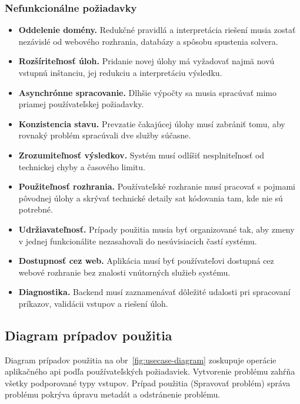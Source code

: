 \subsubsection{Nefunkcionálne požiadavky}\label{sec:design:nonfunctional-requirements}
\begin{itemize}
    \item \textbf{Oddelenie domény.} Redukčné pravidlá a interpretácia riešení musia zostať nezávislé od webového rozhrania, databázy a spôsobu spustenia solvera.
    \item \textbf{Rozšíriteľnosť úloh.} Pridanie novej úlohy má vyžadovať najmä novú vstupnú inštanciu, jej redukciu a interpretáciu výsledku.
    \item \textbf{Asynchrónne spracovanie.} Dlhšie výpočty sa musia spracúvať mimo priamej používateľskej požiadavky.
    \item \textbf{Konzistencia stavu.} Prevzatie čakajúcej úlohy musí zabrániť tomu, aby rovnaký problém spracúvali dve služby súčasne.
    \item \textbf{Zrozumiteľnosť výsledkov.} Systém musí odlíšiť nesplniteľnosť od technickej chyby a časového limitu.
    \item \textbf{Použiteľnosť rozhrania.} Používateľské rozhranie musí pracovať s pojmami pôvodnej úlohy a skrývať technické detaily \acrshort{sat} kódovania tam, kde nie sú potrebné.
    \item \textbf{Udržiavateľnosť.} Prípady použitia musia byť organizované tak, aby zmeny v jednej funkcionálite nezasahovali do nesúvisiacich častí systému.
    \item \textbf{Dostupnosť cez web.} Aplikácia musí byť používateľovi dostupná cez webové rozhranie bez znalosti vnútorných služieb systému.
    \item \textbf{Diagnostika.} Backend musí zaznamenávať dôležité udalosti pri spracovaní príkazov, validácii vstupov a riešení úloh.
\end{itemize}

\subsection{Diagram prípadov použitia}\label{sec:design:use-cases}

Diagram prípadov použitia na obr~\ref{fig:usecase-diagram} zoskupuje operácie aplikačného \acrshort{api} podľa používateľských požiadaviek. Vytvorenie problému zahŕňa všetky podporované typy vstupov. Prípad použitia (Spravovať problém) správa problému pokrýva úpravu metadát a odstránenie problému.

